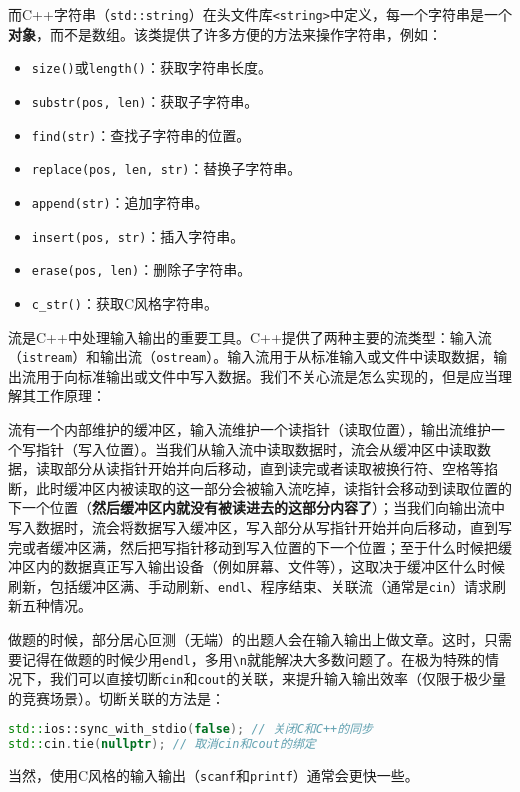\documentclass[../main.tex]{subfiles}
\begin{document}
而C++字符串（\texttt{std::string}）在头文件库\texttt{<string>}中定义，每一个字符串是一个\textbf{对象}，而不是数组。该类提供了许多方便的方法来操作字符串，例如：
\begin{itemize}
  \item \texttt{size()}或\texttt{length()}：获取字符串长度。
  \item \texttt{substr(pos, len)}：获取子字符串。
  \item \texttt{find(str)}：查找子字符串的位置。
  \item \texttt{replace(pos, len, str)}：替换子字符串。
  \item \texttt{append(str)}：追加字符串。
  \item \texttt{insert(pos, str)}：插入字符串。
  \item \texttt{erase(pos, len)}：删除子字符串。
  \item \texttt{c\_str()}：获取C风格字符串。
\end{itemize}

流是C++中处理输入输出的重要工具。C++提供了两种主要的流类型：输入流（\texttt{istream}）和输出流（\texttt{ostream}）。输入流用于从标准输入或文件中读取数据，输出流用于向标准输出或文件中写入数据。我们不关心流是怎么实现的，但是应当理解其工作原理：

流有一个内部维护的缓冲区，输入流维护一个读指针（读取位置），输出流维护一个写指针（写入位置）。当我们从输入流中读取数据时，流会从缓冲区中读取数据，读取部分从读指针开始并向后移动，直到读完或者读取被换行符、空格等掐断，此时缓冲区内被读取的这一部分会被输入流吃掉，读指针会移动到读取位置的下一个位置（\textbf{然后缓冲区内就没有被读进去的这部分内容了}）；当我们向输出流中写入数据时，流会将数据写入缓冲区，写入部分从写指针开始并向后移动，直到写完或者缓冲区满，然后把写指针移动到写入位置的下一个位置；至于什么时候把缓冲区内的数据真正写入输出设备（例如屏幕、文件等），这取决于缓冲区什么时候刷新，包括缓冲区满、手动刷新、\texttt{endl}、程序结束、关联流（通常是\texttt{cin}）请求刷新五种情况。

做题的时候，部分居心叵测（无端）的出题人会在输入输出上做文章。这时，只需要记得在做题的时候少用\texttt{endl}，多用\texttt{\textbackslash n}就能解决大多数问题了。在极为特殊的情况下，我们可以直接切断\texttt{cin}和\texttt{cout}的关联，来提升输入输出效率（仅限于极少量的竞赛场景）。切断关联的方法是：
\begin{lstlisting}[language=C++]
std::ios::sync_with_stdio(false); // 关闭C和C++的同步
std::cin.tie(nullptr); // 取消cin和cout的绑定
\end{lstlisting}
当然，使用C风格的输入输出（\texttt{scanf}和\texttt{printf}）通常会更快一些。
\end{document}
